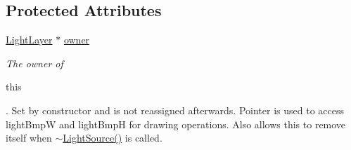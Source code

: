 \subsection*{Protected Attributes}
\begin{DoxyCompactItemize}
\item 
\hyperlink{classlighting_1_1LightLayer}{Light\+Layer} $\ast$ \hyperlink{classlighting_1_1LightSource_ab991aac9d9ab3a1583f4acdc209055d5}{owner}
\begin{DoxyCompactList}\small\item\em The owner of 
\begin{DoxyCode}
\textcolor{keyword}{this}
\end{DoxyCode}
. Set by constructor and is not reassigned afterwards. Pointer is used to access light\+BmpW and light\+BmpH for drawing operations. Also allows {\ttfamily this} to remove itself when \hyperlink{classlighting_1_1LightSource_a2165b5cf6099c6e5d2d6d242c1c8113e}{$\sim$\+Light\+Source()} is called. \end{DoxyCompactList}\end{DoxyCompactItemize}
